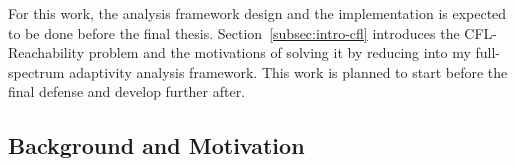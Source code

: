  For this work, the analysis framework design and the implementation is expected to be done before the final thesis.
 Section~\ref*{subsec:intro-cfl} introduces the 
CFL-Reachability problem and the motivations of 
solving it by reducing into my full-spectrum adaptivity analysis framework. 
 This work is planned to start before the final defense and develop further after.

 \subsection{Background and Motivation}
  
